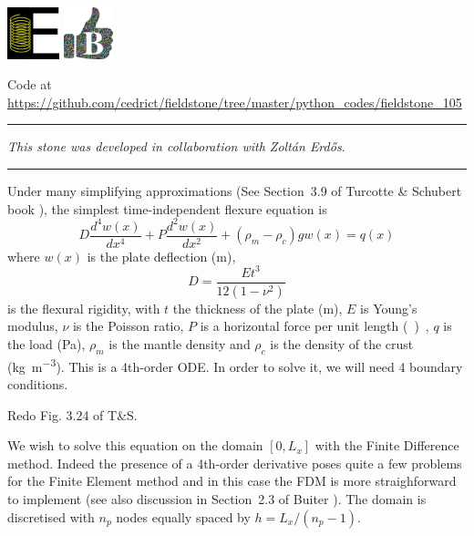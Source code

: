 \includegraphics[height=1.5cm]{images/pictograms/elasticity}
\includegraphics[height=1.5cm]{images/pictograms/benchmark}



\begin{center}
Code at \url{https://github.com/cedrict/fieldstone/tree/master/python_codes/fieldstone_105}
\end{center}

\par\noindent\rule{\textwidth}{0.4pt}

{\sl This stone was developed in collaboration with Zolt{\'a}n Erd{\H{o}}s}. 

\par\noindent\rule{\textwidth}{0.4pt}


Under many simplifying approximations (See Section~3.9 of Turcotte \& Schubert book \cite{tusc}), 
the simplest time-independent flexure equation is
\[
D \frac{d^4w(x)}{dx^4} + P \frac{d^2w(x)}{dx^2} + (\rho_m-\rho_c)g w(x) = q(x)
\]
where $w(x)$ is the plate deflection (\si{m}), 
\[
D=\frac{E t^3}{12(1-\nu^2)}
\]
is the flexural rigidity, with $t$ the thickness of the plate (\si{m}), 
$E$ is Young's modulus, $\nu$ is the Poisson ratio, 
$P$ is a horizontal force per unit length (\si{\kg\per\square\metre\square\sec}),  
$q$ is the load (\si{\pascal}), 
$\rho_m$ is the mantle density and $\rho_c$ is the density of the crust (\si{\kg\per\cubic\metre}).
This is a 4th-order ODE. In order to solve it, we will need 4 boundary conditions.

Redo Fig. 3.24 of T\&S. 

We wish to solve this equation on the domain $[0,L_x]$ with the Finite Difference method. 
Indeed the presence of a 4th-order derivative poses quite a few problems for the Finite Element 
method and in this case the FDM is more straighforward to implement (see also 
discussion in Section~2.3 of Buiter \cite{buiter_thesis}). 
The domain is discretised with $n_p$ nodes equally spaced by $h=L_x/(n_p-1)$.

